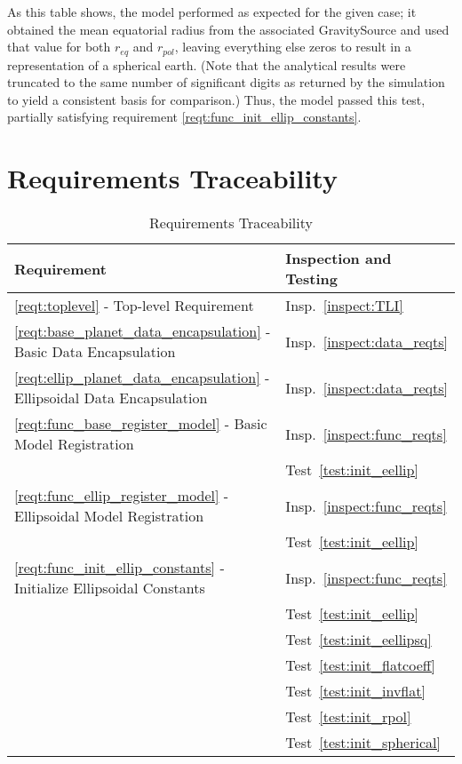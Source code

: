 \begin{description}
As this table shows, the model performed as expected for the given case; it
obtained the mean equatorial radius from the associated GravitySource and used
that value for both $r_{eq}$ and $r_{pol}$, leaving everything else zeros to
result in a representation of a spherical earth. (Note that the analytical
results were truncated to the same number of significant digits as returned by
the simulation to yield a consistent basis for comparison.) Thus, the model
passed this test, partially satisfying requirement
\mbox{\ref{reqt:func_init_ellip_constants}}.
\end{description}

\newpage
\section{Requirements Traceability}\label{sec:traceability}

\begin{longtable}[c]{||p{3in}|p{3in}|}
\caption{Requirements Traceability} \\[6pt]
\hline
{\bf Requirement} & {\bf Inspection and Testing} \\
\hline \hline
\endhead

\ref{reqt:toplevel} - Top-level Requirement &
  Insp.~\ref{inspect:TLI} \\
  \hline

\ref{reqt:base_planet_data_encapsulation} - Basic Data Encapsulation &
   Insp.~\ref{inspect:data_reqts} \\
\hline

\ref{reqt:ellip_planet_data_encapsulation} - Ellipsoidal Data Encapsulation &
   Insp.~\ref{inspect:data_reqts} \\
\hline

\ref{reqt:func_base_register_model} - Basic Model Registration &
   Insp.~\ref{inspect:func_reqts} \\
   &Test~\ref{test:init_eellip} \\
\hline

\ref{reqt:func_ellip_register_model} - Ellipsoidal Model Registration &
   Insp.~\ref{inspect:func_reqts} \\
   &Test~\ref{test:init_eellip} \\
\hline

\ref{reqt:func_init_ellip_constants} - Initialize Ellipsoidal Constants &
   Insp.~\ref{inspect:func_reqts} \\
   &Test~\ref{test:init_eellip} \\
   &Test~\ref{test:init_eellipsq} \\
   &Test~\ref{test:init_flatcoeff} \\
   &Test~\ref{test:init_invflat} \\
   &Test~\ref{test:init_rpol} \\
   &Test~\ref{test:init_spherical} \\
\hline

\end{longtable}

\newpage



